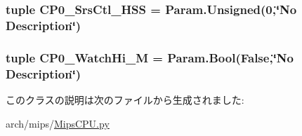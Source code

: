 \label{classMipsCPU_1_1BaseMipsCPU_abf8501ad012082959fc56c8b2fe097d8}
\hypertarget{classMipsCPU_1_1BaseMipsCPU_addbd18e7d62b78411929f56220e7d668}{
\subsubsection[{CP0\_\-SrsCtl\_\-HSS}]{\setlength{\rightskip}{0pt plus 5cm}tuple {\bf CP0\_\-SrsCtl\_\-HSS} = Param.Unsigned(0,\char`\"{}No Description\char`\"{})}}
\label{classMipsCPU_1_1BaseMipsCPU_addbd18e7d62b78411929f56220e7d668}
\hypertarget{classMipsCPU_1_1BaseMipsCPU_ae758ddb5898340503534e2f96d547ed3}{
\subsubsection[{CP0\_\-WatchHi\_\-M}]{\setlength{\rightskip}{0pt plus 5cm}tuple {\bf CP0\_\-WatchHi\_\-M} = Param.Bool(False,\char`\"{}No Description\char`\"{})}}
\label{classMipsCPU_1_1BaseMipsCPU_ae758ddb5898340503534e2f96d547ed3}


このクラスの説明は次のファイルから生成されました:\begin{DoxyCompactItemize}
\item 
arch/mips/\hyperlink{MipsCPU_8py}{MipsCPU.py}\end{DoxyCompactItemize}

